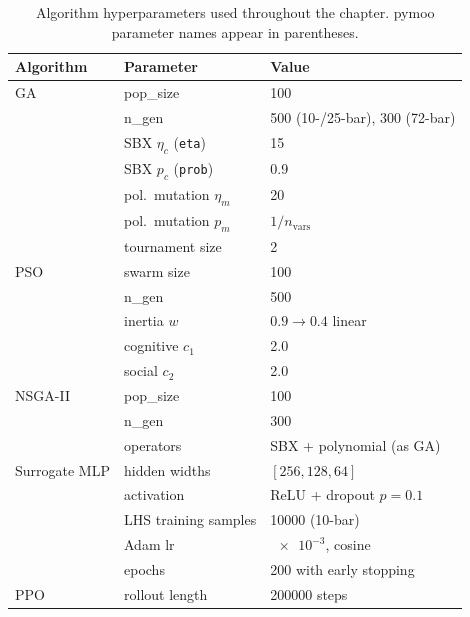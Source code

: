 \begin{table}[htbp]
  \centering
  \caption{Algorithm hyperparameters used throughout the
    chapter. pymoo parameter names appear in parentheses.}
  \label{tab:results:hparams}
  \begin{tabular}{lll}
    \toprule
    Algorithm & Parameter & Value \\
    \midrule
    GA       & pop\_size                       & 100 \\
             & n\_gen                          & 500 (10-/25-bar), 300 (72-bar) \\
             & SBX $\eta_c$ (\texttt{eta})     & 15  \\
             & SBX $p_c$  (\texttt{prob})      & 0.9 \\
             & pol.\ mutation $\eta_m$         & 20  \\
             & pol.\ mutation $p_m$            & $1/n_\text{vars}$ \\
             & tournament size                 & 2   \\
    \midrule
    PSO      & swarm size                      & 100 \\
             & n\_gen                          & 500 \\
             & inertia $w$                     & $0.9 \to 0.4$ linear \\
             & cognitive $c_1$                 & 2.0 \\
             & social $c_2$                    & 2.0 \\
    \midrule
    NSGA-II  & pop\_size                       & 100 \\
             & n\_gen                          & 300 \\
             & operators                       & SBX + polynomial (as GA) \\
    \midrule
    Surrogate MLP & hidden widths             & $[256, 128, 64]$ \\
                  & activation                 & ReLU + dropout $p=0.1$ \\
                  & LHS training samples       & \num{10000} (10-bar) \\
                  & Adam lr                    & $\num{e-3}$, cosine \\
                  & epochs                     & 200 with early stopping \\
    \midrule
    PPO      & rollout length                  & \num{200000} steps \\

\end{tabular}
\end{table}
